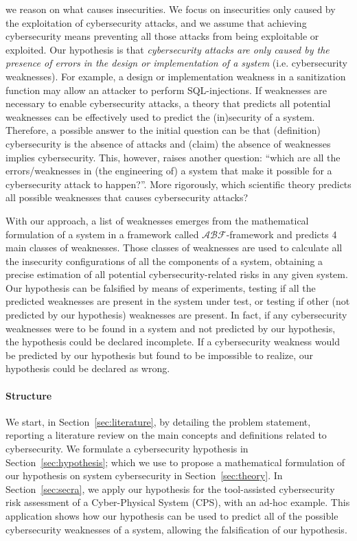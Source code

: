 \documentclass[conference]{IEEEtran}
\newcommand{\assertionRegion}{\mathcal{A}}
\newcommand{\beliefRegion}{\mathcal{B}}
\newcommand{\factRegion}{\mathcal{F}}
\newcommand{\abftheory}{\assertionRegion\beliefRegion\factRegion}
\begin{document}
we reason on what causes insecurities.  We focus on insecurities only caused by
the exploitation of cybersecurity attacks, and we assume that achieving
cybersecurity means preventing all those attacks from being exploitable or
exploited.  Our hypothesis is that \emph{cybersecurity attacks are only caused by the
presence of errors in the design or implementation of a system} (i.e.
cybersecurity weaknesses).  For example, a design or implementation weakness in
a sanitization function may allow an attacker to perform SQL-injections. If
weaknesses are necessary to enable cybersecurity attacks, a theory that
predicts all potential weaknesses can be effectively used to predict the
(in)security of a system.  Therefore, a possible answer to the initial question
can be that (definition) cybersecurity is the absence of attacks and (claim)
the absence of weaknesses implies cybersecurity.  This, however, raises another
question: ``which are all the errors/weaknesses in (the engineering of) a
system that make it possible for a cybersecurity attack to happen?''. More
rigorously, which scientific theory predicts all possible weaknesses that
causes cybersecurity attacks? 

With our approach, a list of weaknesses emerges from the mathematical
formulation of a system in a framework called $\abftheory$-framework and
predicts 4 main classes of weaknesses. Those classes of weaknesses are used to
calculate all the insecurity configurations of all the components of a system,
obtaining a precise estimation of all potential cybersecurity-related risks in
any given system. Our hypothesis can be falsified by means of experiments,
testing if all the predicted weaknesses are present in the system under test,
or testing if other (not predicted by our hypothesis) weaknesses are present.
In fact, if any cybersecurity weaknesses were to be found in a system and not
predicted by our hypothesis, the hypothesis could be declared incomplete.  If a
cybersecurity weakness would be predicted by our hypothesis but found to be impossible
to realize, our hypothesis could be declared as wrong.


\paragraph{Structure} 
We start, in Section~\ref{sec:literature}, by detailing the problem statement,
reporting a literature review on the main concepts and definitions related to
cybersecurity.  We formulate a cybersecurity hypothesis in Section~\ref{sec:hypothesis};
which we use to propose a mathematical formulation of our hypothesis on system cybersecurity in
Section~\ref{sec:theory}. In Section~\ref{sec:secra}, we apply our hypothesis for
the tool-assisted cybersecurity risk assessment of a Cyber-Physical System (CPS), with an ad-hoc example.
This application shows
how our hypothesis can be used to predict all of the possible cybersecurity weaknesses
of a system, allowing the falsification of our hypothesis.  
\end{document}
